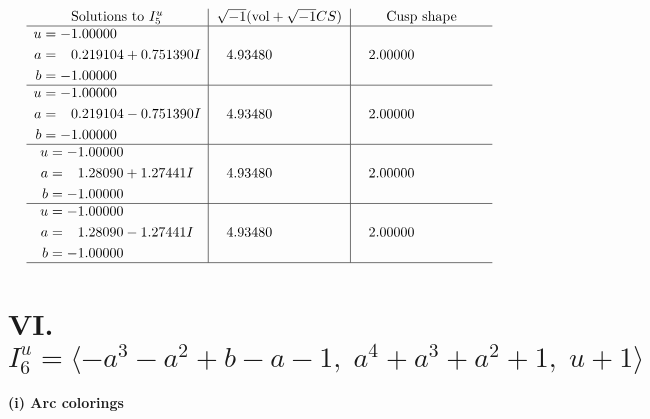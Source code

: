\documentclass[1p]{elsarticle_modified}
\theoremstyle{definition}
\newcommand{\I}{\sqrt{-1}}
\begin{document}
$$\begin{array}{c|c|c}  
\text{Solutions to }I^u_{5}& \I (\text{vol} + \sqrt{-1}CS) & \text{Cusp shape}\\
 \hline 
\begin{aligned}
u &= -1.00000\phantom{ +0.000000I} \\
a &= \phantom{-}0.219104 + 0.751390 I \\
b &= -1.00000\phantom{ +0.000000I}\end{aligned}
 & \phantom{-}4.93480\phantom{ +0.000000I} & \phantom{-}2.00000\phantom{ +0.000000I} \\ \hline\begin{aligned}
u &= -1.00000\phantom{ +0.000000I} \\
a &= \phantom{-}0.219104 - 0.751390 I \\
b &= -1.00000\phantom{ +0.000000I}\end{aligned}
 & \phantom{-}4.93480\phantom{ +0.000000I} & \phantom{-}2.00000\phantom{ +0.000000I} \\ \hline\begin{aligned}
u &= -1.00000\phantom{ +0.000000I} \\
a &= \phantom{-}1.28090 + 1.27441 I \\
b &= -1.00000\phantom{ +0.000000I}\end{aligned}
 & \phantom{-}4.93480\phantom{ +0.000000I} & \phantom{-}2.00000\phantom{ +0.000000I} \\ \hline\begin{aligned}
u &= -1.00000\phantom{ +0.000000I} \\
a &= \phantom{-}1.28090 - 1.27441 I \\
b &= -1.00000\phantom{ +0.000000I}\end{aligned}
 & \phantom{-}4.93480\phantom{ +0.000000I} & \phantom{-}2.00000\phantom{ +0.000000I}\\
 \hline 
 \end{array}$$\newpage\newpage\renewcommand{\arraystretch}{1}
\centering \section*{VI. $I^u_{6}= \langle - a^3- a^2+b- a-1,\;a^4+a^3+a^2+1,\;u+1 \rangle$}
\flushleft \textbf{(i) Arc colorings}\\
\end{document}
